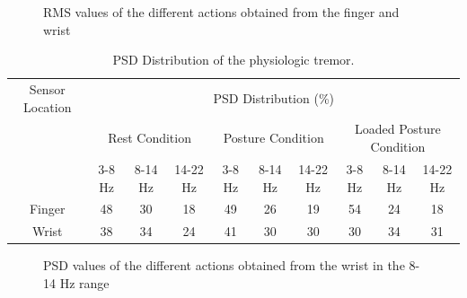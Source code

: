 \documentclass[conference, a4paper]{IEEEtran}
\begin{document}
\begin{figure}[h!]
	\centering
	\label{fig:finger_PC}
	\hfill
	\label{fig:finger_RC}
	\hfill
	\label{fig:finger_LPC}
	\medskip
  \label{fig:wrist_PC}
  \hfill
  \label{fig:wrist_RC}
  \hfill
  \label{fig:wrist_LPC}
	\caption{RMS values of the different actions obtained from the finger and wrist}
	\label{fig:RMS}
\end{figure}
% 
\begin{table}[!h]
\centering
\caption{PSD Distribution of the physiologic tremor.}
\begin{tabular}{c c c c c c c c c c}
\toprule
{Sensor Location} & \multicolumn{9}{c}{PSD Distribution (\%)}{}{} \\
\cmidrule{2-10}
& \multicolumn{3}{c}{Rest Condition} & \multicolumn{3}{c}{Posture Condition} & \multicolumn{3}{c}{Loaded Posture Condition} \\
& {3-8 Hz} & {8-14 Hz} & {14-22 Hz} & {3-8 Hz} & {8-14 Hz} & {14-22 Hz} & {3-8 Hz} & {8-14 Hz} & {14-22 Hz} \\
\midrule \midrule
Finger & 48	& 30 & 18	& 49	& 26	& 19	& 54	& 24	& 18 \\
Wrist  & 38	& 34 & 	24 & 	41 & 30 &	30 &	30 &	34 &	31  \\
\bottomrule
\end{tabular}
\label{tab:features}
\end{table}
% 
\begin{figure}[!h]
	\centering
	\label{fig:wrist_PC_PSD}
	\hfill
	\label{fig:wrist_RC_PSD}
	\hfill
	\label{fig:wrist_LPC_PSD}
	\caption{PSD values of the different actions obtained from the wrist in the 8-14 Hz range}
	\label{fig:PSD}
\end{figure}
\end{document}
